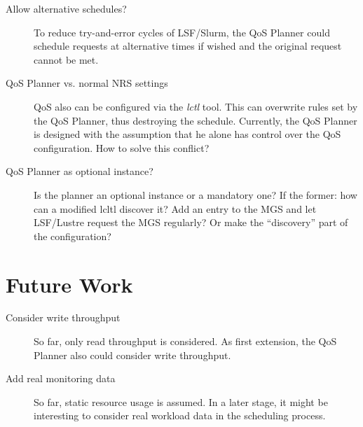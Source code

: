 \documentclass[10pt]{article}
\begin{document}
\begin{description}
 \item[Allow alternative schedules?] To reduce try-and-error cycles of LSF/Slurm, the QoS Planner could schedule requests at alternative times if wished and the original request cannot be met.

 \item[QoS Planner vs. normal NRS settings] QoS also can be configured via the \emph{lctl} tool.
 This can overwrite rules set by the QoS Planner, thus destroying the schedule.
 Currently, the QoS Planner is designed with the assumption that he alone has control over the QoS configuration.
 How to solve this conflict?

 \item[QoS Planner as optional instance?] Is the planner an optional instance or a mandatory one?
 If the former: how can a modified lcltl discover it?
 Add an entry to the MGS and let LSF/Lustre request the MGS regularly?
 Or make the ``discovery'' part of the configuration?
\end{description}


\section{Future Work}

\begin{description}
 \item[Consider write throughput] So far, only read throughput is considered. As first extension, the QoS Planner also could consider write throughput.
 \item[Add real monitoring data] So far, static resource usage is assumed. In a later stage, it might be interesting to consider real workload data in the scheduling process.
\end{description}
\end{document}

